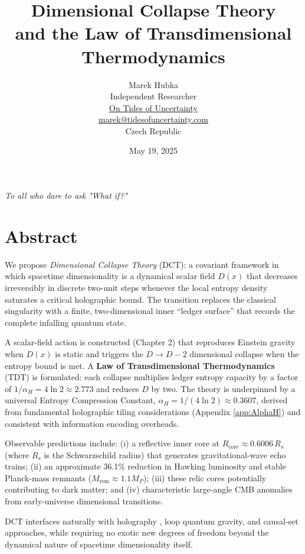 \documentclass[a4paper, 12pt, oneside]{book}
\title{\bfseries Dimensional Collapse Theory\\[1ex]\large and the Law of Transdimensional Thermodynamics}
\author{
    Marek Hubka \\
    \normalsize Independent Researcher\\
    \normalsize \href{http://tidesofuncertainty.com}{On Tides of Uncertainty} \\ 
    \normalsize \href{mailto:marek@tidesofuncertainty.com}{marek@tidesofuncertainty.com} \\
    \normalsize Czech Republic \\
}
\date{May 19, 2025}
\newenvironment{abstract}{\chapter*{Abstract}\addcontentsline{toc}{chapter}{Abstract}}{}
\numberwithin{equation}{chapter}
\begin{document}
\frontmatter
\maketitle

\vspace*{\fill}
\begin{center}
\emph{To all who dare to ask "What if?"}
\end{center}
\vspace*{\fill}
\cleardoublepage

\begin{abstract}
We propose \emph{Dimensional Collapse Theory} (DCT): a covariant framework in which
spacetime dimensionality is a dynamical scalar field $D(x)$ that decreases
irreversibly in discrete two-unit steps whenever the local entropy density
saturates \cite{GibbonsHawking1977} a critical holographic bound. The transition replaces the classical
singularity with a finite, two-dimensional inner ``ledger surface'' that records the
complete infalling quantum state.

A scalar-field action is constructed (Chapter 2) that reproduces Einstein gravity when
$D(x)$ is static and triggers the $D \to D-2$ dimensional collapse when the entropy bound is met.
A \textbf{Law of Transdimensional Thermodynamics} (TDT) is formulated: each collapse multiplies
ledger entropy capacity by a factor of $1/\alpha_H = 4\ln 2 \approx 2.773$ and reduces $D$ by two.
The theory is underpinned by a universal Entropy Compression Constant, $\alpha_H = 1/(4\ln 2) \approx 0.3607$, derived from fundamental holographic tiling considerations (Appendix \ref{app:AlphaH}) and consistent with information encoding overheads.

Observable predictions include: (i) a reflective inner core at
$R_{\text{core}}\!\approx\!0.6006\,R_s$ (where $R_s$ is the Schwarzschild radius) that generates gravitational-wave echo trains; (ii) an approximate 36.1\% reduction in Hawking luminosity \cite{Hawking1975} and stable Planck-mass remnants ($M_{\text{rem}} \approx 1.1 M_P$); (iii) these relic cores potentially contributing to dark matter; and (iv) characteristic large-angle CMB \cite{Planck2020} anomalies from early-universe dimensional transitions.

DCT interfaces naturally with holography \cite{tHooft1993,Susskind1995}, loop quantum gravity, and
causal-set approaches, while requiring no exotic new degrees of freedom beyond the dynamical nature of spacetime dimensionality itself.
\end{abstract}
\end{document}

